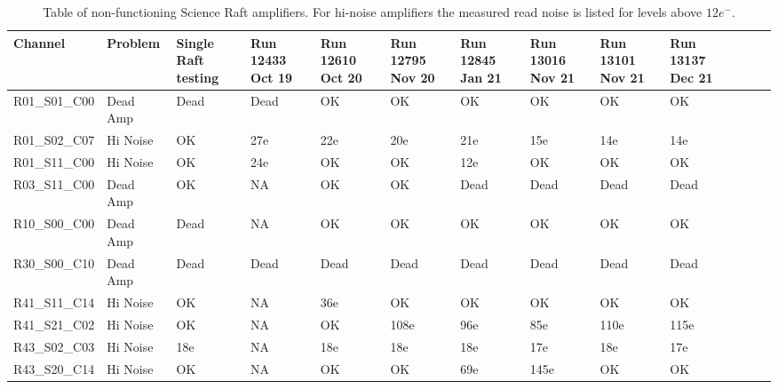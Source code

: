 \begin{table}[!ht]
    \tiny
    \centering
    \begin{tabular}{|l|l|l|l|l|l|l|l|l|l|l|l|l|}
    \hline
        Channel & Problem & \makecell{ Single Raft \\ testing } & \makecell{ Run 12433 \\ Oct 19} & \makecell{ Run 12610 \\ Oct 20} & \makecell{ Run 12795 \\ Nov 20} & \makecell{ Run 12845 \\ Jan 21} & \makecell{ Run 13016 \\ Nov 21} & \makecell{ Run 13101 \\ Nov 21} & \makecell{Run 13137 \\ Dec 21} \\ \hline
        R01\_S01\_C00  & Dead Amp & Dead & Dead & OK & OK & OK & OK & OK & OK \\ \hline
        R01\_S02\_C07  & Hi Noise & OK & 27e & 22e & 20e & 21e & 15e & 14e & 14e \\ \hline
        R01\_S11\_C00  & Hi Noise & OK & 24e & OK & OK & 12e & OK & OK & OK \\ \hline
        R03\_S11\_C00  & Dead Amp & OK & NA & OK & OK & Dead & Dead & Dead & Dead \\ \hline
        R10\_S00\_C00  & Dead Amp & Dead & NA & OK & OK & OK & OK & OK & OK \\ \hline
        R30\_S00\_C10  & Dead Amp & Dead & Dead & Dead & Dead & Dead & Dead & Dead & Dead \\ \hline
        R41\_S11\_C14  & Hi Noise & OK & NA & 36e & OK & OK & OK & OK & OK \\ \hline
        R41\_S21\_C02  & Hi Noise & OK & NA & OK & 108e & 96e & 85e & 110e & 115e \\ \hline
        R43\_S02\_C03  & Hi Noise & 18e & NA & 18e & 18e & 18e & 17e & 18e & 17e \\ \hline
        R43\_S20\_C14  & Hi Noise & OK & NA & OK & OK & 69e & 145e & OK & OK \\ \hline

    \end{tabular}
    \caption{Table of non-functioning Science Raft amplifiers. For hi-noise amplifiers the measured read noise is listed for levels above $12e^{-}$. \label{tab:BOTbadamp}}
\end{table}

